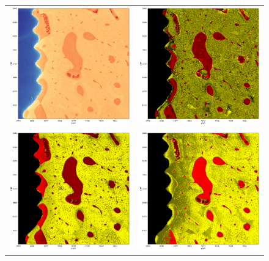 \begin{figure}
    \centering
    \begin{tabular}{cc}
        \includegraphics[width=.45\linewidth]{generated/770c_pag_segmented_zy_raw.pdf} &
        \includegraphics[width=.45\linewidth]{generated/770c_pag_global_zy_otsu.pdf}
        \\
        \includegraphics[width=.45\linewidth]{generated/770c_pag_segmented_zy_colored.pdf} &
        \includegraphics[width=.45\linewidth]{generated/770c_pag_global_zy.pdf} \\

\end{tabular}
\end{figure}
